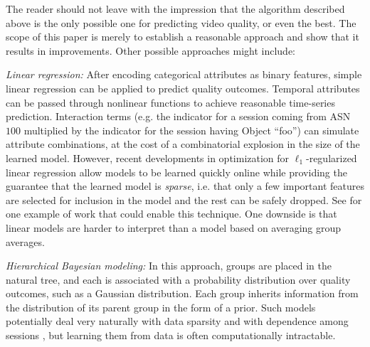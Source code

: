 {
The reader should not leave with the impression that the algorithm described above is the only possible one for predicting video quality, or even the best.  The scope of this paper is merely to establish a reasonable approach and show that it results in improvements.  Other possible approaches might include:
\begin{packedenumerate}
  \item \emph{Linear regression:} After encoding categorical attributes as binary features, simple linear regression can be applied to predict quality outcomes.  Temporal attributes can be passed through nonlinear functions to achieve reasonable time-series prediction.  Interaction terms (e.g. the indicator for a session coming from ASN $100$ multiplied by the indicator for the session having Object ``foo'') can simulate attribute combinations, at the cost of a combinatorial explosion in the size of the learned model.  However, recent developments in optimization for $\ell_1$-regularized linear regression allow models to be learned quickly online while providing the guarantee that the learned model is \emph{sparse}, i.e. that only a few important features are selected for inclusion in the model and the rest can be safely dropped.  See \cite{duchi2010composite} for one example of work that could enable this technique.  One downside is that linear models are harder to interpret than a model based on averaging group averages.
  \item \emph{Hierarchical Bayesian modeling:} In this approach, groups are placed in the natural tree, and each is associated with a probability distribution over quality outcomes, such as a Gaussian distribution.  Each group inherits information from the distribution of its parent group in the form of a prior.  Such models potentially deal very naturally with data sparsity and with dependence among sessions \cite{gelman2003bayesian}, but learning them from data is often computationally intractable.
\end{packedenumerate}
}
